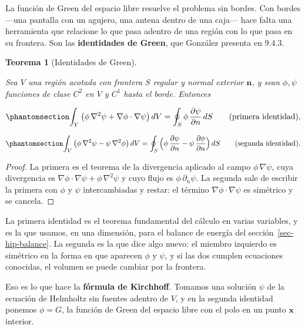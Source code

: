 \documentclass[
  spanish,
  a4paper,
]{scrbook}
\theoremstyle{definition}
\theoremstyle{plain}
\theoremstyle{definition}
\theoremstyle{plain}
\newtheorem{theorem}{Teorema}[chapter]
\theoremstyle{definition}
\theoremstyle{remark}
\begin{document}
La función de Green del espacio libre resuelve el problema sin bordes.
Con bordes ---una pantalla con un agujero, una antena dentro de una
caja--- hace falta una herramienta que relacione lo que pasa adentro de
una región con lo que pasa en su frontera. Son las \textbf{identidades
de Green}, que González presenta en 9.4.3.

\begin{theorem}[Identidades de
Green]\protect\hypertarget{thm-hip-identidades-green}{}\label{thm-hip-identidades-green}

Sea \(V\) una región acotada con frontera \(S\) regular y normal
exterior \(\mathbf n\), y sean \(\phi,\psi\) funciones de clase \(C^2\)
en \(V\) y \(C^1\) hasta el borde. Entonces

\begin{equation}\protect\phantomsection\label{eq-hip-green-1}{
\int_V\big(\phi\,\nabla^2\psi + \nabla\phi\cdot\nabla\psi\big)\,dV = \oint_S\phi\,\frac{\partial\psi}{\partial n}\,dS
\qquad\text{(primera identidad)},
}\end{equation}

\begin{equation}\protect\phantomsection\label{eq-hip-green-2}{
\int_V\big(\phi\,\nabla^2\psi - \psi\,\nabla^2\phi\big)\,dV = \oint_S\Big(\phi\,\frac{\partial\psi}{\partial n} - \psi\,\frac{\partial\phi}{\partial n}\Big)\,dS
\qquad\text{(segunda identidad)}.
}\end{equation}

\end{theorem}

\begin{proof}
La primera es el teorema de la divergencia aplicado al campo
\(\phi\,\nabla\psi\), cuya divergencia es
\(\nabla\phi\cdot\nabla\psi + \phi\,\nabla^2\psi\) y cuyo flujo es
\(\phi\,\partial_n\psi\). La segunda sale de escribir la primera con
\(\phi\) y \(\psi\) intercambiadas y restar: el término
\(\nabla\phi\cdot\nabla\psi\) es simétrico y se cancela.
\end{proof}

La primera identidad es el teorema fundamental del cálculo en varias
variables, y es la que usamos, en una dimensión, para el balance de
energía del sección~\ref{sec-hip-balance}. La segunda es la que dice
algo nuevo: el miembro izquierdo es simétrico en la forma en que
aparecen \(\phi\) y \(\psi\), y si las dos cumplen ecuaciones conocidas,
el volumen se puede cambiar por la frontera.

Eso es lo que hace la \textbf{fórmula de Kirchhoff}. Tomamos una
solución \(\psi\) de la ecuación de Helmholtz sin fuentes adentro de
\(V\), y en la segunda identidad ponemos \(\phi = G\), la función de
Green del espacio libre con el polo en un punto \(\mathbf x\) interior.
\end{document}
